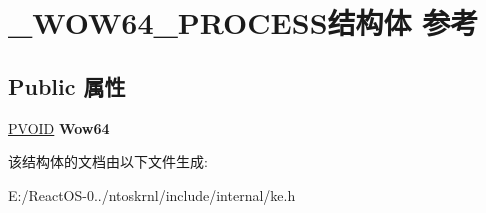 \hypertarget{struct___w_o_w64___p_r_o_c_e_s_s}{}\section{\+\_\+\+W\+O\+W64\+\_\+\+P\+R\+O\+C\+E\+S\+S结构体 参考}
\label{struct___w_o_w64___p_r_o_c_e_s_s}
\subsection*{Public 属性}
\begin{DoxyCompactItemize}
\item 
\mbox{\label{struct___w_o_w64___p_r_o_c_e_s_s_ac6a79e77a2def83167e36f4c099e579a}} 
\hyperlink{interfacevoid}{P\+V\+O\+ID} {\bfseries Wow64}
\end{DoxyCompactItemize}


该结构体的文档由以下文件生成\+:\begin{DoxyCompactItemize}
\item 
E\+:/\+React\+O\+S-\/0../ntoskrnl/include/internal/ke.\+h\end{DoxyCompactItemize}
